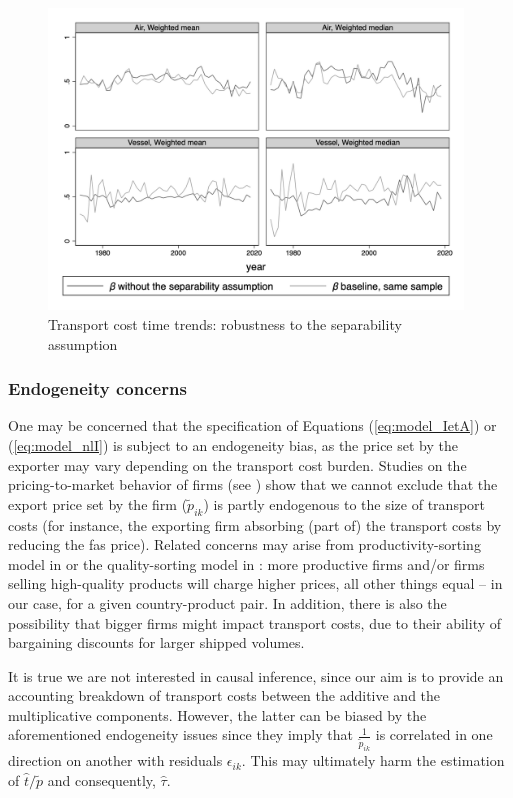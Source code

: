 \documentclass[a4paper,11pt]{article}
\begin{document}
\begin{figure}[htbp]
	\caption{Transport cost time trends: robustness to the separability assumption}
	\label{fig:comp_separability_SITC5}
	\begin{center}
		\includegraphics[height=8cm]
		{scatter_chronology_non_separe_pour_robustesse_ns.png}
	\end{center}
\end{figure}



\subsubsection{Endogeneity concerns} One may be concerned that the specification of Equations (\ref{eq:model_IetA}) or (\ref{eq:model_nlI}) is subject to an endogeneity bias, as the price set by the exporter may vary depending on the transport cost burden. Studies on the pricing-to-market behavior of firms (see \citealp{Krugman-87}) show that we cannot exclude that the export price set by the firm ($\widetilde{p}_{ik}$) is partly endogenous to the size of transport costs (for instance, the exporting firm absorbing (part of) the transport costs by reducing the fas price).
Related concerns may arise from productivity-sorting model in \cite{melitz} or the quality-sorting model in \cite{baldwin_harrigan}: more productive firms and/or firms selling high-quality products will charge higher prices, all other things equal – in our case, for a given country-product pair. In addition, there is also the possibility that bigger firms might impact transport costs, due to their ability of bargaining discounts for larger shipped volumes.

It is true we are not interested in causal inference, since our aim is to provide an accounting breakdown of transport costs between the additive and the multiplicative components. However, the latter can be biased by the aforementioned endogeneity issues since they imply that $\frac{1}{\widetilde{p}_{ik}}$ is correlated in one direction on another with residuals $\epsilon_{ik}$. This may ultimately harm the estimation of $\widehat{t}/\widetilde{p}$ and consequently, $\widehat{\tau}$.
\end{document}
